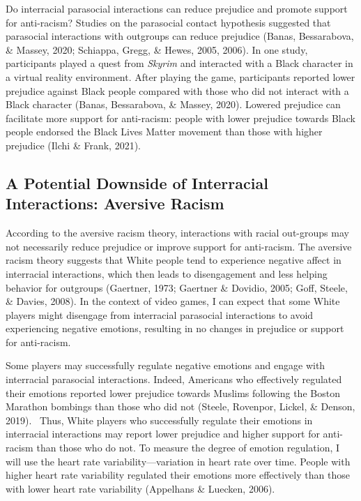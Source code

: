 \documentclass[
  english,
  man, noextraspace,floatsintext]{apa6}
\begin{document}
Do interracial parasocial interactions can reduce prejudice and promote support for anti-racism? Studies on the parasocial contact hypothesis suggested that parasocial interactions with outgroups can reduce prejudice (Banas, Bessarabova, \& Massey, 2020; Schiappa, Gregg, \& Hewes, 2005, 2006). In one study, participants played a quest from \emph{Skyrim} and interacted with a Black character in a virtual reality environment. After playing the game, participants reported lower prejudice against Black people compared with those who did not interact with a Black character (Banas, Bessarabova, \& Massey, 2020). Lowered prejudice can facilitate more support for anti-racism: people with lower prejudice towards Black people endorsed the Black Lives Matter movement than those with higher prejudice (Ilchi \& Frank, 2021).~

\hypertarget{a-potential-downside-of-interracial-interactions-aversive-racism}{%
\subsection{A Potential Downside of Interracial Interactions: Aversive Racism}\label{a-potential-downside-of-interracial-interactions-aversive-racism}}

According to the aversive racism theory, interactions with racial out-groups may not necessarily reduce prejudice or improve support for anti-racism. The aversive racism theory suggests that White people tend to experience negative affect in interracial interactions, which then leads to disengagement and less helping behavior for outgroups (Gaertner, 1973; Gaertner \& Dovidio, 2005; Goff, Steele, \& Davies, 2008). In the context of video games, I can expect that some White players might disengage from interracial parasocial interactions to avoid experiencing negative emotions, resulting in no changes in prejudice or support for anti-racism.~

Some players may successfully regulate negative emotions and engage with interracial parasocial interactions. Indeed, Americans who effectively regulated their emotions reported lower prejudice towards Muslims following the Boston Marathon bombings than those who did not (Steele, Rovenpor, Lickel, \& Denson, 2019).~ Thus, White players who successfully regulate their emotions in interracial interactions may report lower prejudice and higher support for anti-racism than those who do not. To measure the degree of emotion regulation, I will use the heart rate variability---variation in heart rate over time. People with higher heart rate variability regulated their emotions more effectively than those with lower heart rate variability (Appelhans \& Luecken, 2006).
\end{document}

